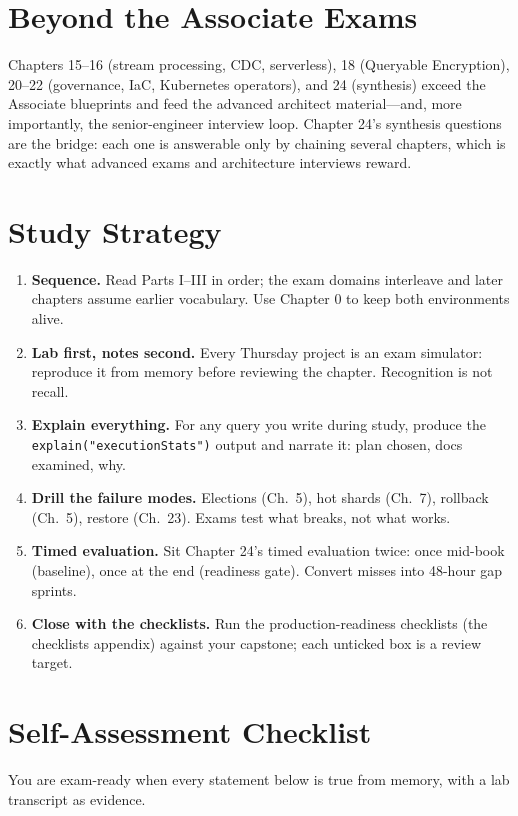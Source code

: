 \section{Beyond the Associate Exams}
Chapters 15--16 (stream processing, CDC, serverless), 18 (Queryable Encryption), 20--22
(governance, IaC, Kubernetes operators), and 24 (synthesis) exceed the Associate blueprints and
feed the advanced architect material---and, more importantly, the senior-engineer interview loop.
Chapter 24's synthesis questions are the bridge: each one is answerable only by chaining several
chapters, which is exactly what advanced exams and architecture interviews reward.

\section{Study Strategy}
\begin{enumerate}
    \item \textbf{Sequence.} Read Parts I--III in order; the exam domains interleave and later
    chapters assume earlier vocabulary. Use Chapter 0 to keep both environments alive.
    \item \textbf{Lab first, notes second.} Every Thursday project is an exam simulator:
    reproduce it from memory before reviewing the chapter. Recognition is not recall.
    \item \textbf{Explain everything.} For any query you write during study, produce the
    \texttt{explain("executionStats")} output and narrate it: plan chosen, docs examined, why.
    \item \textbf{Drill the failure modes.} Elections (Ch.~5), hot shards (Ch.~7), rollback
    (Ch.~5), restore (Ch.~23). Exams test what breaks, not what works.
    \item \textbf{Timed evaluation.} Sit Chapter 24's timed evaluation twice: once mid-book
    (baseline), once at the end (readiness gate). Convert misses into 48-hour gap sprints.
    \item \textbf{Close with the checklists.} Run the production-readiness checklists
    (the checklists appendix) against your capstone; each unticked box is a review target.
\end{enumerate}

\section{Self-Assessment Checklist}
You are exam-ready when every statement below is true from memory, with a lab transcript as
evidence.

